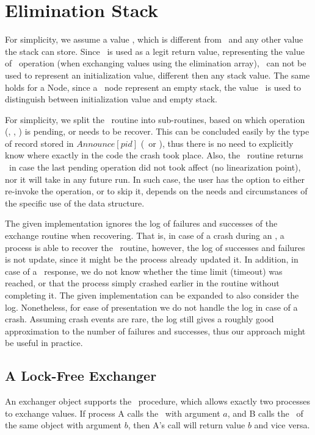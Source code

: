 


\section{Elimination Stack}
\label{section:elimination-stack}

For simplicity, we assume a value \init, which is different from \NULL\ and any other value the stack can store. Since \NULL\ is used as a legit return value, representing the value of \pop\ operation (when exchanging values using the elimination array), \NULL\ can not be used to represent an initialization value, different then any stack value. The same holds for a Node, since a \NULL\ node represent an empty stack, the value \init\ is used to distinguish between initialization value and empty stack.

For simplicity, we split the \recover\ routine into sub-routines, based on which operation (\push, \pop, \exchange) is pending, or needs to be recover. This can be concluded easily by the type of record stored in $Announce[pid]$ (\exInfo\ or \opInfo), thus there is no need to explicitly know where exactly in the code the crash took place. Also, the \recover\ routine returns \fail\ in case the last pending operation did not took affect (no linearization point), nor it will take in any future run. In such case, the user has the option to either re-invoke the operation, or to skip it, depends on the needs and circumstances of the specific use of the data structure.

The given implementation ignores the log of failures and successes of the exchange routine when recovering. That is, in case of a crash during an \exchange, a process is able to recover the \exchange\ routine, however, the log of successes and failures is not update, since it might be the process already updated it. In addition, in case of a \fail\ response, we do not know whether the time limit (timeout) was reached, or that the process simply crashed earlier in the routine without completing it. The given implementation can be expanded to also consider the log. Nonetheless, for ease of presentation we do not handle the log in case of a crash. Assuming crash events are rare, the log still gives a roughly good approximation to the number of failures and successes, thus our approach might be useful in practice.

\subsection{A Lock-Free Exchanger}
An exchanger object supports the \exchange\ procedure, which allows exactly two processes to exchange values.
If process A calls the \exchange\ with argument $a$, and B calls the \exchange\ of the same object with argument $b$, then A's call will return value $b$ and vice versa.

